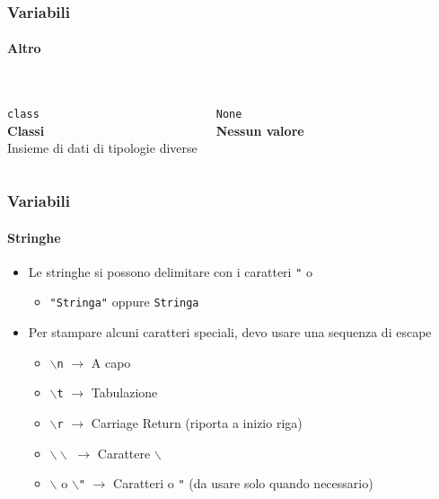 \begin{contentframe}
    \frametitle{Variabili}
    \framesubtitle{Altro}

    \begin{columns}
        \centering
        {\Huge\faSitemap}\\
        \bigskip
        \texttt{class}\\
        \textbf{Classi}\\
        \bigskip
        Insieme di dati di tipologie diverse

        \centering
        {\Huge\faTimes}\\
        \bigskip
        \texttt{None}\\
        \textbf{Nessun valore}\\
        \bigskip
        \bigskip
    \end{columns}
\end{contentframe}

\begin{contentframe}
    \frametitle{Variabili}
    \framesubtitle{Stringhe}

    \begin{itemize}
        \item Le stringhe si possono delimitare con i caratteri \texttt{"} o \textquotesingle{}
        \begin{itemize}
            \item \texttt{"Stringa"} oppure \texttt{\textquotesingle{}Stringa\textquotesingle{}}
        \end{itemize}

        \bigskip
        \item Per stampare alcuni caratteri speciali, devo usare una sequenza di escape
        \begin{itemize}
            \item \texttt{$\backslash$n} $\rightarrow$ A capo
            \item \texttt{$\backslash$t} $\rightarrow$ Tabulazione
            \item \texttt{$\backslash$r} $\rightarrow$ Carriage Return (riporta a inizio riga)
            \item \texttt{$\backslash\backslash$} $\rightarrow$ Carattere \texttt{$\backslash$}
            \item \texttt{$\backslash$\textquotesingle{}} o \texttt{$\backslash$"} $\rightarrow$ Caratteri \texttt{\textquotesingle{}} o \texttt{"} (da usare solo quando necessario)
        \end{itemize}
    \end{itemize}
\end{contentframe}

